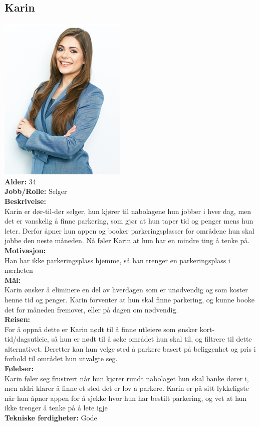 \documentclass[12pt]{article}
\begin{document}
    \subsection{Karin}
    \includegraphics[scale=1]{bilder/personaer/persona_karin.jpg}\\
    \textbf{Alder:} 34 \\
    \textbf{Jobb/Rolle:} Selger\\
    \textbf{Beskrivelse:}\\
    Karin er dør-til-dør selger, hun kjører til nabolagene hun jobber i hver dag, men det er vanskelig å finne parkering, som gjør at hun taper tid og penger mens hun leter. Derfor åpner hun appen og booker parkeringsplasser for områdene hun skal jobbe den neste måneden. Nå føler Karin at hun har en mindre ting å tenke på.\\
    \textbf{Motivasjon:}\\
    Han har ikke parkeringsplass hjemme, så han trenger en parkeringsplass i nærheten\\
    \textbf{Mål:}\\
    Karin ønsker å eliminere en del av hverdagen som er unødvendig og som koster henne tid og penger. Karin forventer at hun skal finne parkering, og kunne booke det for måneden fremover, eller på dagen om nødvendig.\\
    \textbf{Reisen:}\\
    For å oppnå dette er Karin nødt til å finne utleiere som ønsker kort-tid/dagsutleie, så hun er nødt til å søke området hun skal til, og filtrere til dette alternativet. Deretter kan hun velge sted å parkere basert på beliggenhet og pris i forhold til området hun utvalgte seg.\\
    \textbf{Følelser:}\\
    Karin føler seg frustrert når hun kjører rundt nabolaget hun skal banke dører i, men aldri klarer å finne et sted det er lov å parkere. Karin er på sitt lykkeligste når hun åpner appen for å sjekke hvor hun har bestilt parkering, og vet at hun ikke trenger å tenke på å lete igje\\
    \textbf{Tekniske ferdigheter:} Gode
\end{document}
